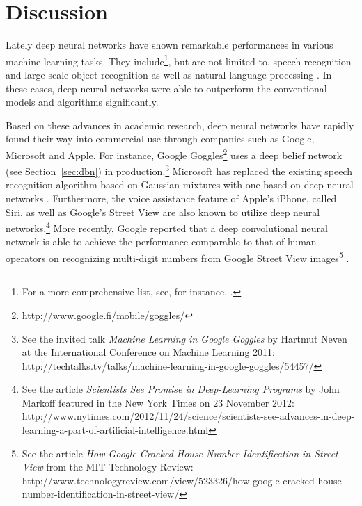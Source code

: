 \documentclass{now}
\begin{document}
\chapter{Discussion}
\label{chap:discussion}

Lately deep neural networks have shown remarkable
performances in various machine learning tasks. They
include\footnote{For a more comprehensive list, see, for
instance, \citep{Bengio2013pami}.  }, but are not limited
to, speech recognition \citep[see,
e.g.,][]{Hinton2012sp,Dahl2012} and large-scale object
recognition \citep[see,
e.g.,][]{Goodfellow2013,Krizhevsky2012,Hinton2012} as well
as natural language processing \citep[see,
e.g.,][]{Socher2011}. In these cases, deep neural networks
were able to outperform the conventional models and
algorithms significantly.

Based on these advances in academic research, deep neural
networks have rapidly found their way into commercial use
through companies such as Google, Microsoft and Apple.  For
instance, Google Goggles\footnote{
http://www.google.fi/mobile/goggles/ } uses a deep belief
network (see Section~\ref{sec:dbn}) in
production.\footnote{See the invited talk \textit{Machine
Learning in Google Goggles} by Hartmut Neven at the
International Conference on Machine Learning 2011:
http://techtalks.tv/talks/machine-learning-in-google-goggles/54457/}
Microsoft has replaced the existing speech recognition
algorithm based on Gaussian mixtures with one based on deep
neural networks \citep{Deng2013}. Furthermore, the voice
assistance feature of Apple's iPhone, called Siri, as well
as Google's Street View are also known to utilize deep
neural networks.\footnote{See the article \textit{Scientists
See Promise in Deep-Learning Programs} by John Markoff
featured in the New York Times on 23 November 2012: \\
http://www.nytimes.com/2012/11/24/science/scientists-see-advances-in-deep-learning-a-part-of-artificial-intelligence.html
} More recently, Google reported that a deep convolutional
neural network is able to achieve the performance comparable
to that of human operators on recognizing multi-digit
numbers from Google Street View images\footnote{
See the article \textit{How Google Cracked House Number
Identification in Street View} from the MIT Technology
Review:
\\http://www.technologyreview.com/view/523326/how-google-cracked-house-number-identification-in-street-view/
}
\citep{Goodfellow2013}.
\end{document}
